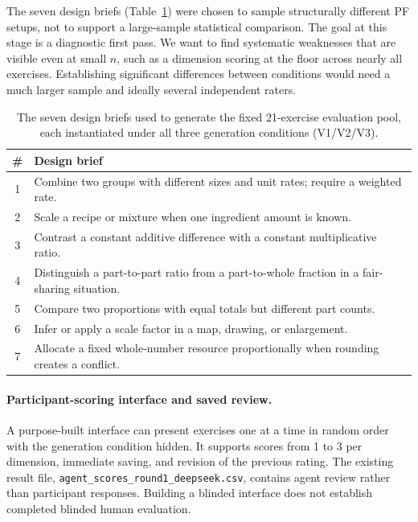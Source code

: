 The seven design briefs (Table~\ref{tab:design-briefs}) were chosen to sample structurally different PF setups, not to support a large-sample statistical comparison. The goal at this stage is a diagnostic first pass. We want to find systematic weaknesses that are visible even at small $n$, such as a dimension scoring at the floor across nearly all exercises. Establishing significant differences between conditions would need a much larger sample and ideally several independent raters.

\begin{table}[h]
\centering
\small
\begin{tabular}{@{}cl@{}}
\toprule
\textbf{\#} & \textbf{Design brief} \\
\midrule
1 & Combine two groups with different sizes and unit rates; require a weighted rate. \\
2 & Scale a recipe or mixture when one ingredient amount is known. \\
3 & Contrast a constant additive difference with a constant multiplicative ratio. \\
4 & Distinguish a part-to-part ratio from a part-to-whole fraction in a fair-sharing situation. \\
5 & Compare two proportions with equal totals but different part counts. \\
6 & Infer or apply a scale factor in a map, drawing, or enlargement. \\
7 & Allocate a fixed whole-number resource proportionally when rounding creates a conflict. \\
\bottomrule
\end{tabular}
\caption{The seven design briefs used to generate the fixed 21-exercise evaluation pool, each instantiated under all three generation conditions (V1/V2/V3).}
\label{tab:design-briefs}
\end{table}

\paragraph{Participant-scoring interface and saved review.} A purpose-built interface can present exercises one at a time in random order with the generation condition hidden. It supports scores from 1 to 3 per dimension, immediate saving, and revision of the previous rating. The existing result file, \texttt{agent\_scores\_round1\_deepseek.csv}, contains agent review rather than participant responses. Building a blinded interface does not establish completed blinded human evaluation.

